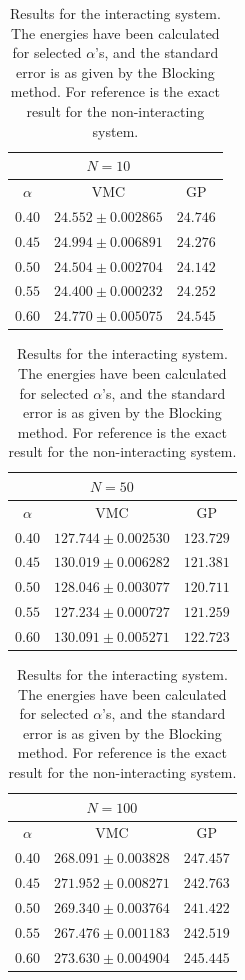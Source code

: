 \documentclass[a4paper, 11pt]{article}
\begin{document}
\clearpage
\begin{table}
    \center
    \caption{Results for the interacting system. The energies have been
    calculated for selected $\alpha$'s, and the standard error is as given by
    the Blocking method. For reference is the exact result for the
    non-interacting system.}
    \label{tab:inter-manual}
\begin{tabular}{|c|c|c|}\hline
$\,$ & $N=10$ & $\,$ \\ \hline
$\alpha$ & VMC & GP\\ \hline
$0.40$ & $24.552 \pm 0.002865$ & $24.746$\\ \hline
$0.45$ & $24.994 \pm 0.006891$ & $24.276$\\ \hline
$0.50$ & $24.504 \pm 0.002704$ & $24.142$\\ \hline
$0.55$ & $24.400 \pm 0.000232$ & $24.252$\\ \hline
$0.60$ & $24.770 \pm 0.005075$ & $24.545$\\ \hline
\end{tabular}
\vspace{0.5cm}
\begin{tabular}{|c|c|c|}\hline
$\,$ & $N=50$ & $\,$ \\ \hline
$\alpha$ & VMC & GP\\ \hline
$0.40$ & $127.744 \pm 0.002530$ & $123.729$\\ \hline
$0.45$ & $130.019 \pm 0.006282$ & $121.381$\\ \hline
$0.50$ & $128.046 \pm 0.003077$ & $120.711$\\ \hline
$0.55$ & $127.234 \pm 0.000727$ & $121.259$\\ \hline
$0.60$ & $130.091 \pm 0.005271$ & $122.723$\\ \hline
\end{tabular}
\vspace{0.5cm}
\begin{tabular}{|c|c|c|}\hline
$\,$ & $N=100$ & $\,$ \\ \hline
$\alpha$ & VMC & GP\\ \hline
$0.40$ & $268.091 \pm 0.003828$ & $247.457$\\ \hline
$0.45$ & $271.952 \pm 0.008271$ & $242.763$\\ \hline
$0.50$ & $269.340 \pm 0.003764$ & $241.422$\\ \hline
$0.55$ & $267.476 \pm 0.001183$ & $242.519$\\ \hline
$0.60$ & $273.630 \pm 0.004904$ & $245.445$\\ \hline
\end{tabular}
\end{table}
\end{document}
